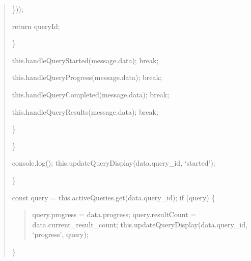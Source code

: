 \documentclass[letterpaper,10pt,english]{sphinxmanual}
\begin{document}
\begin{quote}
\begin{description}
\begin{description}
\end{description}

\sphinxAtStartPar
\}));

\sphinxAtStartPar
return queryId;

\end{description}

\sphinxAtStartPar
\}
\begin{description}
\begin{description}
\begin{description}
\sphinxAtStartPar
this.handleQueryStarted(message.data);
break;

\sphinxAtStartPar
this.handleQueryProgress(message.data);
break;

\sphinxAtStartPar
this.handleQueryCompleted(message.data);
break;

\sphinxAtStartPar
this.handleQueryResults(message.data);
break;

\end{description}

\end{description}

\sphinxAtStartPar
\}

\end{description}

\sphinxAtStartPar
\}
\begin{description}
\sphinxAtStartPar
console.log();
this.updateQueryDisplay(data.query\_id, ‘started’);

\end{description}

\sphinxAtStartPar
\}
\begin{description}
\sphinxAtStartPar
const query = this.activeQueries.get(data.query\_id);
if (query) \{
\begin{quote}

\sphinxAtStartPar
query.progress = data.progress;
query.resultCount = data.current\_result\_count;
this.updateQueryDisplay(data.query\_id, ‘progress’, query);
\end{quote}

\sphinxAtStartPar
\}

\end{description}


\end{quote}
\end{document}
